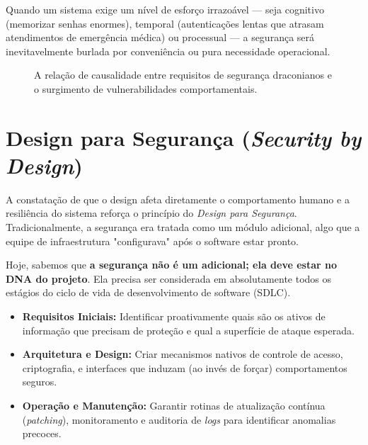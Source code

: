 \documentclass[12pt,a4paper,twoside]{report}
\begin{document}
Quando um sistema exige um nível de esforço irrazoável — seja cognitivo (memorizar senhas enormes), temporal (autenticações lentas que atrasam atendimentos de emergência médica) ou processual — a segurança será inevitavelmente burlada por conveniência ou pura necessidade operacional.

\begin{figure}[h]
    \centering
    \caption{A relação de causalidade entre requisitos de segurança draconianos e o surgimento de vulnerabilidades comportamentais.}
    \label{fig:design_vs_erro}
\end{figure}

\section{Design para Segurança (\textit{Security by Design})}
A constatação de que o design afeta diretamente o comportamento humano e a resiliência do sistema reforça o princípio do \textit{Design para Segurança}. Tradicionalmente, a segurança era tratada como um módulo adicional, algo que a equipe de infraestrutura "configurava" após o software estar pronto.

Hoje, sabemos que \textbf{a segurança não é um adicional; ela deve estar no DNA do projeto}. Ela precisa ser considerada em absolutamente todos os estágios do ciclo de vida de desenvolvimento de software (SDLC).

\begin{itemize}
    \item \textbf{Requisitos Iniciais:} Identificar proativamente quais são os ativos de informação que precisam de proteção e qual a superfície de ataque esperada.
    \item \textbf{Arquitetura e Design:} Criar mecanismos nativos de controle de acesso, criptografia, e interfaces que induzam (ao invés de forçar) comportamentos seguros.
    \item \textbf{Operação e Manutenção:} Garantir rotinas de atualização contínua (\textit{patching}), monitoramento e auditoria de \textit{logs} para identificar anomalias precoces.
\end{itemize}
\end{document}
